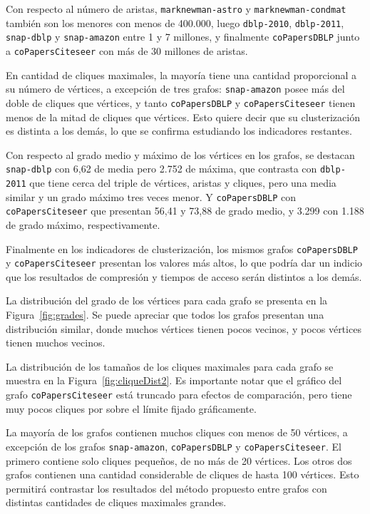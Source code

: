 Con respecto al número de aristas, \texttt{marknewman-astro} y \texttt{marknewman-condmat} también son los menores con menos de 400.000, luego \texttt{dblp-2010}, \texttt{dblp-2011}, \texttt{snap-dblp} y \texttt{snap-amazon} entre 1 y 7 millones, y finalmente \texttt{coPapersDBLP} junto a \texttt{coPapersCiteseer} con más de 30 millones de aristas.

En cantidad de cliques maximales, la mayoría tiene una cantidad proporcional a su número de vértices, a excepción de tres grafos: \texttt{snap-amazon} posee más del doble de cliques que vértices, y tanto \texttt{coPapersDBLP} y \texttt{coPapersCiteseer} tienen menos de la mitad de cliques que vértices. Esto quiere decir que su clusterización es distinta a los demás, lo que se confirma estudiando los indicadores restantes.

Con respecto al grado medio y máximo de los vértices en los grafos, se destacan \texttt{snap-dblp} con 6,62 de media pero 2.752 de máxima, que contrasta con \texttt{dblp-2011} que tiene cerca del triple de vértices, aristas y cliques, pero una media similar y un grado máximo tres veces menor. Y \texttt{coPapersDBLP} con \texttt{coPapersCiteseer} que presentan 56,41 y 73,88 de grado medio, y 3.299 con 1.188 de grado máximo, respectivamente.

Finalmente en los indicadores de clusterización, los mismos grafos \texttt{coPapersDBLP} y \texttt{coPapersCiteseer} presentan los valores más altos, lo que podría dar un indicio que los resultados de compresión y tiempos de acceso serán distintos a los demás. 


%
%


La distribución del grado de los vértices para cada grafo se presenta en la Figura~\ref{fig:grades}. Se puede apreciar que todos los grafos presentan una distribución similar, donde muchos vértices tienen pocos vecinos, y pocos vértices tienen muchos vecinos.




La distribución de los tamaños de los cliques maximales para cada grafo se muestra en la Figura~\ref{fig:cliqueDist2}. Es importante notar que el gráfico del grafo \texttt{coPapersCiteseer} está truncado para efectos de comparación, pero tiene muy pocos cliques por sobre el límite fijado gráficamente.

La mayoría de los grafos contienen muchos cliques con menos de 50 vértices, a excepción de los grafos \texttt{snap-amazon}, \texttt{coPapersDBLP} y \texttt{coPapersCiteseer}. El primero contiene solo cliques pequeños, de no más de 20 vértices. Los otros dos grafos contienen una cantidad considerable de cliques de hasta 100 vértices. Esto permitirá contrastar los resultados del método propuesto entre grafos con distintas cantidades de cliques maximales grandes.

